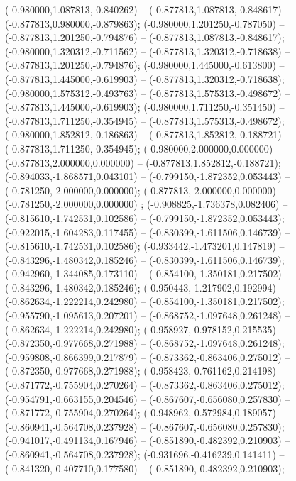  (-0.980000,1.087813,-0.840262) -- (-0.877813,1.087813,-0.848617) -- (-0.877813,0.980000,-0.879863);
 (-0.980000,1.201250,-0.787050) -- (-0.877813,1.201250,-0.794876) -- (-0.877813,1.087813,-0.848617);
 (-0.980000,1.320312,-0.711562) -- (-0.877813,1.320312,-0.718638) -- (-0.877813,1.201250,-0.794876);
 (-0.980000,1.445000,-0.613800) -- (-0.877813,1.445000,-0.619903) -- (-0.877813,1.320312,-0.718638);
 (-0.980000,1.575312,-0.493763) -- (-0.877813,1.575313,-0.498672) -- (-0.877813,1.445000,-0.619903);
 (-0.980000,1.711250,-0.351450) -- (-0.877813,1.711250,-0.354945) -- (-0.877813,1.575313,-0.498672);
 (-0.980000,1.852812,-0.186863) -- (-0.877813,1.852812,-0.188721) -- (-0.877813,1.711250,-0.354945);
 (-0.980000,2.000000,0.000000) -- (-0.877813,2.000000,0.000000) -- (-0.877813,1.852812,-0.188721);
 (-0.894033,-1.868571,0.043101) -- (-0.799150,-1.872352,0.053443) -- (-0.781250,-2.000000,0.000000);
 (-0.877813,-2.000000,0.000000) -- (-0.781250,-2.000000,0.000000) ;
 (-0.908825,-1.736378,0.082406) -- (-0.815610,-1.742531,0.102586) -- (-0.799150,-1.872352,0.053443);
 (-0.922015,-1.604283,0.117455) -- (-0.830399,-1.611506,0.146739) -- (-0.815610,-1.742531,0.102586);
 (-0.933442,-1.473201,0.147819) -- (-0.843296,-1.480342,0.185246) -- (-0.830399,-1.611506,0.146739);
 (-0.942960,-1.344085,0.173110) -- (-0.854100,-1.350181,0.217502) -- (-0.843296,-1.480342,0.185246);
 (-0.950443,-1.217902,0.192994) -- (-0.862634,-1.222214,0.242980) -- (-0.854100,-1.350181,0.217502);
 (-0.955790,-1.095613,0.207201) -- (-0.868752,-1.097648,0.261248) -- (-0.862634,-1.222214,0.242980);
 (-0.958927,-0.978152,0.215535) -- (-0.872350,-0.977668,0.271988) -- (-0.868752,-1.097648,0.261248);
 (-0.959808,-0.866399,0.217879) -- (-0.873362,-0.863406,0.275012) -- (-0.872350,-0.977668,0.271988);
 (-0.958423,-0.761162,0.214198) -- (-0.871772,-0.755904,0.270264) -- (-0.873362,-0.863406,0.275012);
 (-0.954791,-0.663155,0.204546) -- (-0.867607,-0.656080,0.257830) -- (-0.871772,-0.755904,0.270264);
 (-0.948962,-0.572984,0.189057) -- (-0.860941,-0.564708,0.237928) -- (-0.867607,-0.656080,0.257830);
 (-0.941017,-0.491134,0.167946) -- (-0.851890,-0.482392,0.210903) -- (-0.860941,-0.564708,0.237928);
 (-0.931696,-0.416239,0.141411) -- (-0.841320,-0.407710,0.177580) -- (-0.851890,-0.482392,0.210903);
